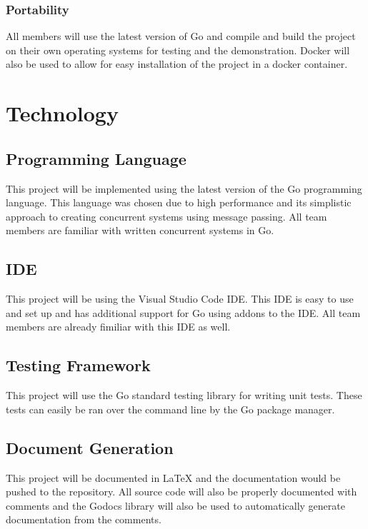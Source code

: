\documentclass[12pt,letterpaper]{article}
\begin{document}
\subsubsection{Portability}

All members will use the latest version of Go and compile and build the project on their own operating systems for testing and the demonstration. {\color{red} Docker will also be used to allow for easy installation of the project in a docker container}.

\section{Technology}

\subsection{Programming Language}

This project will be implemented using the latest version of the Go programming language. This language was chosen due to high performance and its simplistic approach to creating concurrent systems using message passing. All team members are familiar with written concurrent systems in Go.

\subsection{IDE}

This project will be using the Visual Studio Code IDE. This IDE is easy to use and set up and has additional support for Go using addons to the IDE. All team members are already fimiliar with this IDE as well.

\subsection{Testing Framework}

This project will use the Go standard testing library for writing unit tests. These tests can easily be ran over the command line by the Go package manager.

\subsection{Document Generation}

This project will be documented in LaTeX and the documentation would be pushed to the repository. All source code will also be properly documented with comments and the Godocs library will also be used to automatically generate documentation from the comments.
\end{document}
